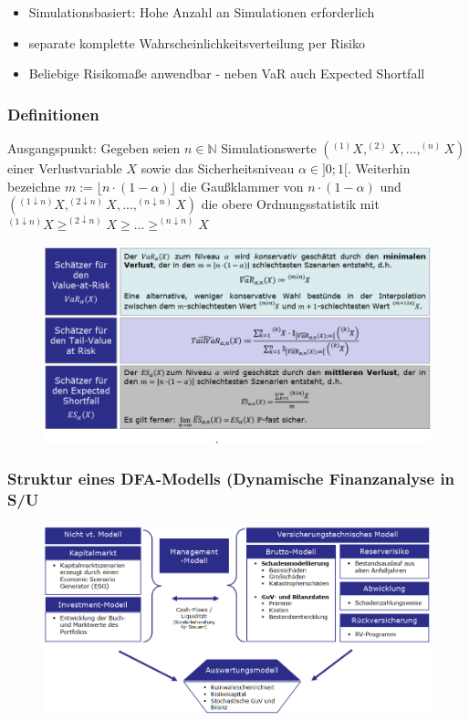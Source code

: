 \documentclass[12pt]{report}
\theoremstyle{dotless}
\theoremstyle{definition}
\begin{document}
\begin{itemize}
\item Simulationsbasiert: Hohe Anzahl an Simulationen erforderlich
\item separate komplette Wahrscheinlichkeitsverteilung per Risiko
\item Beliebige Risikomaße anwendbar - neben VaR auch Expected Shortfall
\end{itemize}


\subsubsection{Definitionen}
Ausgangspunkt: Gegeben seien $n \in \mathbb{N}$ Simulationswerte $(^{(1)}X, ^{(2)}X, ..., ^{(n)}X)$ einer Verlustvariable $X$ sowie das Sicherheitsniveau $\alpha \in ]0;1[$. Weiterhin bezeichne $m:= \lfloor n \cdot (1- \alpha) \rfloor$ die Gaußklammer von $n \cdot (1- \alpha)$ und $(^{(1\downarrow n)}X, ^{(2\downarrow n)}X, ..., ^{(n\downarrow n)}X)$ die obere Ordnungsstatistik mit $^{(1\downarrow n)} X \geq ^{(2\downarrow n)} X \geq ... \geq ^{(n\downarrow n)} X$

\begin{figure}[ht]
	\centering
	\includegraphics[width= \textwidth]{Bilder/Definitionen1.png}
\end{figure}

\subsubsection{Struktur eines DFA-Modells (Dynamische Finanzanalyse in S/U}

\begin{figure}[ht]
	\centering
	\includegraphics[width=0.8 \textwidth]{Bilder/DFA.png}
\end{figure}
\end{document}
